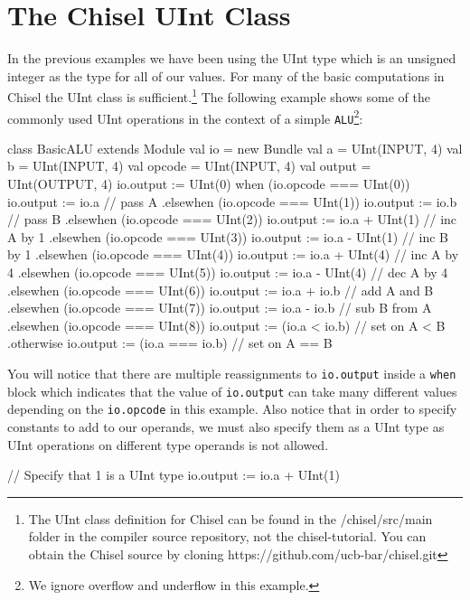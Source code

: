\section{The Chisel UInt Class}

In the previous examples we have been using the UInt type which is an unsigned integer as the type for all of our values. For many of the basic computations in Chisel the UInt class is sufficient.\footnote{The UInt class definition for Chisel can be found in the /chisel/src/main folder in the compiler source repository, not the chisel-tutorial. You can obtain the Chisel source by cloning https://github.com/ucb-bar/chisel.git} The following example shows some of the commonly used UInt operations in the context of a simple \verb+ALU+\footnote{We ignore overflow and underflow in this example.}:

\begin{scala}
class BasicALU extends Module {
  val io = new Bundle {
    val a      = UInt(INPUT, 4)
    val b      = UInt(INPUT, 4)
    val opcode = UInt(INPUT, 4)
    val output = UInt(OUTPUT, 4)
  }
  io.output := UInt(0) 
  when (io.opcode === UInt(0)) {
    io.output := io.a                   // pass A
  } .elsewhen (io.opcode === UInt(1)) {
    io.output := io.b                   // pass B
  } .elsewhen (io.opcode === UInt(2)) {
    io.output := io.a + UInt(1)         // inc A by 1
  } .elsewhen (io.opcode === UInt(3)) {
    io.output := io.a - UInt(1)         // inc B by 1
  } .elsewhen (io.opcode === UInt(4)) {
    io.output := io.a + UInt(4)         // inc A by 4
  } .elsewhen (io.opcode === UInt(5)) {
    io.output := io.a - UInt(4)         // dec A by 4
  } .elsewhen (io.opcode === UInt(6)) {
    io.output := io.a + io.b            // add A and B
  } .elsewhen (io.opcode === UInt(7)) {
    io.output := io.a - io.b            // sub B from A
  } .elsewhen (io.opcode === UInt(8)) {
    io.output := (io.a < io.b)          // set on A < B
  } .otherwise { 
    io.output := (io.a === io.b)        // set on A == B
  }
}
\end{scala}

You will notice that there are multiple reassignments to \verb+io.output+ inside a \verb+when+ block which indicates that the value of \verb+io.output+ can take many different values depending on the \verb+io.opcode+ in this example. Also notice that in order to specify constants to add to our operands, we must also specify them as a UInt type as UInt operations on different type operands is not allowed.

\begin{scala}
// Specify that 1 is a UInt type
io.output := io.a + UInt(1) 
\end{scala}

